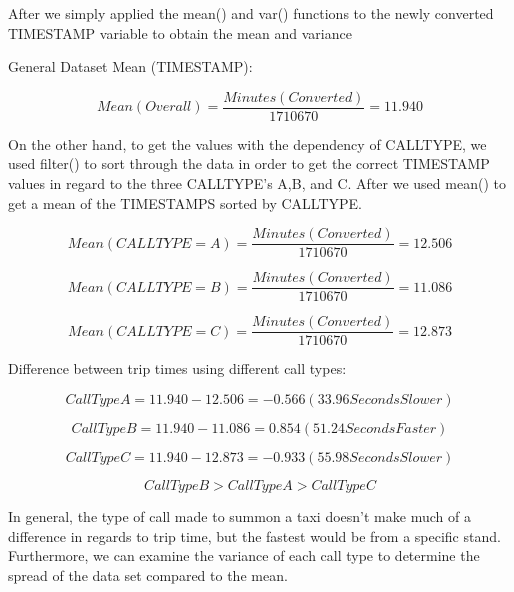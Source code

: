 \documentclass[11pt]{article}
\begin{document}
\par
After we simply applied the mean() and var() functions to the newly converted TIMESTAMP variable to obtain the mean and variance

\par
General Dataset Mean (TIMESTAMP):

\begin{equation}
Mean (Overall) = \frac{Minutes (Converted)}{1710670} = 11.940
\end{equation}

\par
On the other hand, to get the values with the dependency of CALLTYPE, we used filter() to sort through the data in order to get the correct TIMESTAMP values in regard to the three CALLTYPE’s A,B, and C. After we used mean() to get a mean of the TIMESTAMPS sorted by CALLTYPE. 

\begin{equation}
Mean (CALLTYPE = A) = \frac{Minutes (Converted)}{1710670} = 12.506
\end{equation}

\begin{equation}
Mean (CALLTYPE = B) = \frac{Minutes (Converted)}{1710670} = 11.086
\end{equation}

\begin{equation}
Mean (CALLTYPE = C) = \frac{Minutes (Converted)}{1710670} = 12.873
\end{equation}

\par
Difference between trip times using different call types:

\begin{equation}
Call Type A = 11.940 - 12.506 = -0.566 (33.96 Seconds Slower)
\end{equation}

\begin{equation}
Call Type B = 11.940 - 11.086 = 0.854(51.24 Seconds Faster)
\end{equation}

\begin{equation}
Call Type C = 11.940 - 12.873 = -0.933 (55.98 Seconds Slower)
\end{equation}

\begin{equation}
Call Type B >Call Type A > Call Type C
\end{equation}

\par
In general, the type of call made to summon a taxi doesn’t make much of a difference in regards to trip time, but the fastest would be from a specific stand. Furthermore, we can examine the variance of each call type to determine the spread of the data set compared to the mean.
\end{document}

